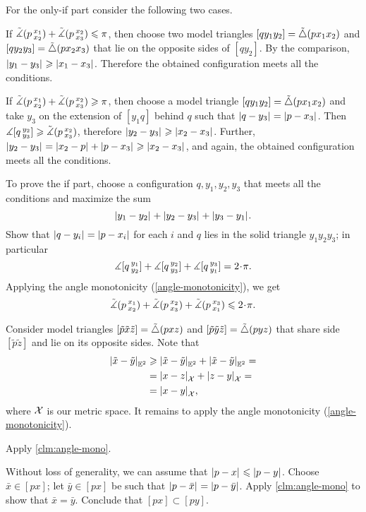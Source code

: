  For the only-if part consider the following two cases.

If $\tilde\measuredangle(p\,{}^{x_1}_{x_2})+\tilde\measuredangle(p\,{}^{x_2}_{x_3})\leqslant \pi$, then choose two model triangles $[qy_1y_2]=\tilde\triangle(px_1x_2)$ and $[qy_2y_3]=\tilde\triangle(px_2x_3)$ that lie on the opposite sides of $[qy_2]$.
By the comparison, $|{y_1}-{y_3}|_{}^{{}}\geqslant |{x_1}-{x_3}|_{}^{{}}$.
Therefore the obtained configuration meets all the conditions.

If $\tilde\measuredangle(p\,{}^{x_1}_{x_2})+\tilde\measuredangle(p\,{}^{x_2}_{x_3})\geqslant \pi$, then choose a model triangle $[qy_1y_2]=\tilde\triangle(px_1x_2)$
and take $y_3$ on the extension of $[y_1q]$ behind $q$ such that $|{q}-{y_3}|_{}^{{}}=|{p}-{x_3}|_{}^{{}}$.
Then $\measuredangle [q\,{}^{y_2}_{y_3}]\geqslant \tilde\measuredangle(p\,{}^{x_2}_{x_3})$, therefore $|{y_2}-{y_3}|_{}^{{}}\geqslant |{x_2}-{x_3}|_{}^{{}}$.
Further, $|{y_2}-{y_3}|_{}^{{}}=|{x_2}-{p}|_{}^{{}}+|{p}-{x_3}|_{}^{{}} \geqslant |{x_2}-{x_3}|_{}^{{}}$,
and again, the obtained configuration meets all the conditions.

To prove the if part, choose a configuration $q,y_1,y_2,y_3$ that meets all the conditions and maximize the sum
\[|{y_1}-{y_2}|_{}^{{}}+|{y_2}-{y_3}|_{}^{{}}+|{y_3}-{y_1}|_{}^{{}}.\]
Show that $|{q}-{y_i}|_{}^{{}}=|{p}-{x_i}|_{}^{{}}$ for each $i$ and $q$ lies in the solid triangle $y_1y_2y_3$;
in particular 
\[\mangle \hinge q{y_1}{y_2}+\mangle \hinge q{y_2}{y_3}+ \mangle \hinge q{y_3}{y_1}=2\cdot\pi.\]
Applying the angle monotonicity (\ref{angle-monotonicity}), we get
\[\angk  p{x_1}{x_2}+\angk p{x_2}{x_3}+\angk p{x_3}{x_1}
\le 
2\cdot\pi.
\]

Consider model triangles $[\tilde p\tilde x\tilde z]=\tilde\triangle(pxz)$ and $[\tilde p\tilde y\tilde z]=\tilde\triangle(pyz)$
that share side $[\tilde p\tilde z]$ and lie on its opposite sides.
Note that 
\begin{align*}
|{\tilde x}-{\tilde y}|_{\mathbb{E}^2}^{{}}
&\geqslant |{\tilde x}-{\tilde y}|_{\mathbb{E}^2}^{{}}+|{\tilde x}-{\tilde y}|_{\mathbb{E}^2}^{{}}=
\\
&=|{x}-{z}|_{\mathcal{X}}^{{}}+|{z}-{y}|_{\mathcal{X}}^{{}}=
\\
&=|{x}-{y}|_{\mathcal{X}}^{{}},
\end{align*}
where $\mathcal{X}$ is our metric space.
It remains to apply the angle monotonicity (\ref{angle-monotonicity}).


Apply \ref{clm:angle-mono}.

Without loss of generality, we can assume that $|{p}-{x}|_{}^{{}}\leqslant |{p}-{y}|_{}^{{}}$.
Choose $\bar x\in [px]$;
let $\bar y\in [px]$ be such that $|{p}-{\bar x}|_{}^{{}}=|{p}-{\bar y}|_{}^{{}}$.
Apply \ref{clm:angle-mono} to show that $\bar x=\bar y$.
Conclude that $[px]\subset [py]$.

